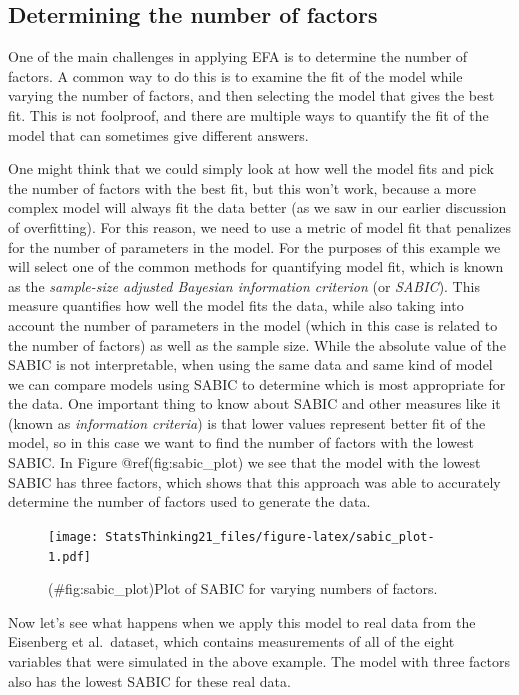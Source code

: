 \documentclass[
  12pt,
]{book}
\begin{document}
\hypertarget{determining-the-number-of-factors}{%
\subsection{Determining the number of factors}\label{determining-the-number-of-factors}}

One of the main challenges in applying EFA is to determine the number of factors. A common way to do this is to examine the fit of the model while varying the number of factors, and then selecting the model that gives the best fit. This is not foolproof, and there are multiple ways to quantify the fit of the model that can sometimes give different answers.

One might think that we could simply look at how well the model fits and pick the number of factors with the best fit, but this won't work, because a more complex model will always fit the data better (as we saw in our earlier discussion of overfitting). For this reason, we need to use a metric of model fit that penalizes for the number of parameters in the model. For the purposes of this example we will select one of the common methods for quantifying model fit, which is known as the \emph{sample-size adjusted Bayesian information criterion} (or \emph{SABIC}). This measure quantifies how well the model fits the data, while also taking into account the number of parameters in the model (which in this case is related to the number of factors) as well as the sample size. While the absolute value of the SABIC is not interpretable, when using the same data and same kind of model we can compare models using SABIC to determine which is most appropriate for the data. One important thing to know about SABIC and other measures like it (known as \emph{information criteria}) is that lower values represent better fit of the model, so in this case we want to find the number of factors with the lowest SABIC. In Figure @ref(fig:sabic\_plot) we see that the model with the lowest SABIC has three factors, which shows that this approach was able to accurately determine the number of factors used to generate the data.

\begin{figure}
\centering
\texttt{[image: StatsThinking21\_files/figure-latex/sabic\_plot-1.pdf]}
\caption{(\#fig:sabic\_plot)Plot of SABIC for varying numbers of factors.}
\end{figure}

Now let's see what happens when we apply this model to real data from the Eisenberg et al.~dataset, which contains measurements of all of the eight variables that were simulated in the above example. The model with three factors also has the lowest SABIC for these real data.
\end{document}
